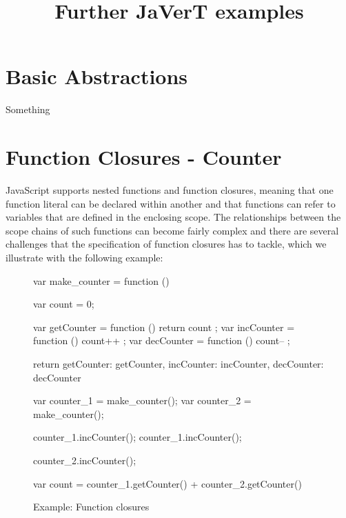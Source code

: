 \documentclass{llncs}
\begin{document}
\title{Further JaVerT examples}



\maketitle

\section{Basic Abstractions}
Something

\newpage
\section{Function Closures - Counter}
\label{sec:closures}

JavaScript supports nested functions and function closures, meaning that one function literal can be declared within another and that functions can refer to variables that are defined in the enclosing scope. 
The relationships between the scope chains of such functions can become fairly complex and there are several challenges that the specification of function closures has to tackle, which we illustrate with the following example:

\begin{figure}[!h]
\centering
\begin{minipage}{0.75\textwidth}
\begin{lstjs}[firstnumber=1]
var make_counter = function () {
   var count = 0;

   var getCounter = function () { return count };
   var incCounter = function () { count++ };
   var decCounter = function () { count-- };

   return { getCounter: getCounter, incCounter: incCounter, decCounter: decCounter }
}

var counter_1 = make_counter();
var counter_2 = make_counter();

counter_1.incCounter();
counter_1.incCounter();

counter_2.incCounter();

var count = counter_1.getCounter() + counter_2.getCounter()
\end{lstjs}
\end{minipage}
\vspace*{-0.2cm}
\caption{Example: Function closures}
\label{fig:fc}
\end{figure}
\end{document}
